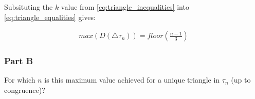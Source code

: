 Subsituting the $k$ value from \ref{eq:triangle_inequalities} into \ref{eq:triangle_equalities} gives:

\begin{gather}
    max(D(\triangle{\tau_n})) = floor\left(\frac{n-1}{3}\right)
\end{gather}

\subsubsection*{Part B}

For which $n$ is this maximum value achieved for a unique triangle in $\tau_n$ (up to congruence)?